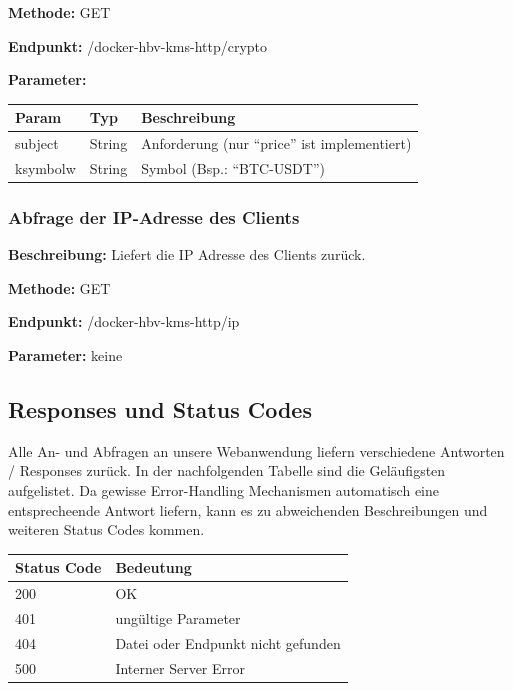 \textbf{Methode:} GET

\textbf{Endpunkt:} /docker-hbv-kms-http/crypto

\textbf{Parameter:}
\begin{table}[H]
    \label{table:/docker-hbv-kms-http/crypto}
    \setlength{\tabcolsep}{3pt}
    \begin{tabular}{p{100pt}p{80pt}p{200pt}}
        \hline
        Param    & Typ    & Beschreibung                                  \\
        \hline
        subject  & String & Anforderung (nur ``price'' ist implementiert) \\
        ksymbolw & String & Symbol (Bsp.: ``BTC-USDT'')                   \\
        \hline
    \end{tabular}
\end{table}
\dotfill

\subsubsection{Abfrage der IP-Adresse des Clients}
\label{sec:api-client-ip}
\textbf{Beschreibung:} Liefert die IP Adresse des Clients zurück.

\textbf{Methode:} GET

\textbf{Endpunkt:} /docker-hbv-kms-http/ip

\textbf{Parameter:} keine

\dotfill


\subsection{Responses und Status Codes}
\label{sec:nodechapter-implementation-responses}
Alle An- und Abfragen an unsere Webanwendung liefern verschiedene Antworten / Responses zurück. In der nachfolgenden Tabelle
sind die Geläufigsten aufgelistet. Da gewisse Error-Handling Mechanismen automatisch eine entsprecheende Antwort liefern,
kann es zu abweichenden Beschreibungen und weiteren Status Codes kommen.
\begin{table}[H]
    \label{table:responsecodes}
    \setlength{\tabcolsep}{3pt}
    \begin{tabular}{p{100pt}p{280pt}}
        \hline
        Status Code & Bedeutung                          \\
        \hline
        200         & OK                                 \\
        401         & ungültige Parameter                \\
        404         & Datei oder Endpunkt nicht gefunden \\
        500         & Interner Server Error              \\
        \hline
    \end{tabular}
\end{table}

